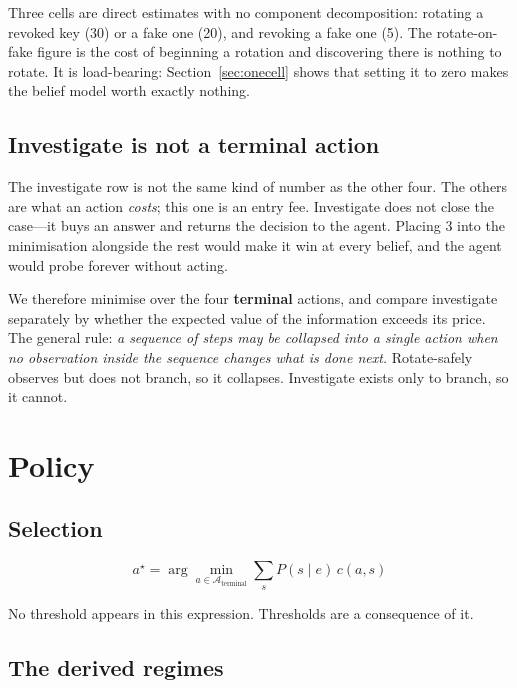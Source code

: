 \documentclass{article}
\begin{document}
Three cells are direct estimates with no component decomposition: rotating a
revoked key (30) or a fake one (20), and revoking a fake one (5). The
rotate-on-fake figure is the cost of beginning a rotation and discovering there
is nothing to rotate. It is load-bearing: Section~\ref{sec:onecell} shows that
setting it to zero makes the belief model worth exactly nothing.

\subsection{Investigate is not a terminal action}
\label{sec:notterminal}

The investigate row is not the same kind of number as the other four. The others
are what an action \emph{costs}; this one is an entry fee. Investigate does not
close the case---it buys an answer and returns the decision to the agent.
Placing 3 into the minimisation alongside the rest would make it win at every
belief, and the agent would probe forever without acting.

We therefore minimise over the four \textbf{terminal} actions, and compare
investigate separately by whether the expected value of the information exceeds
its price. The general rule: \emph{a sequence of steps may be collapsed into a
single action when no observation inside the sequence changes what is done
next.} Rotate-safely observes but does not branch, so it collapses. Investigate
exists only to branch, so it cannot.

\section{Policy}

\subsection{Selection}

\begin{equation}
a^\star = \arg\min_{a \in \mathcal{A}_{\text{terminal}}}
\sum_{s} P(s \mid e)\, c(a, s)
\end{equation}

No threshold appears in this expression. Thresholds are a consequence of it.

\subsection{The derived regimes}
\label{sec:regimes}
\end{document}
